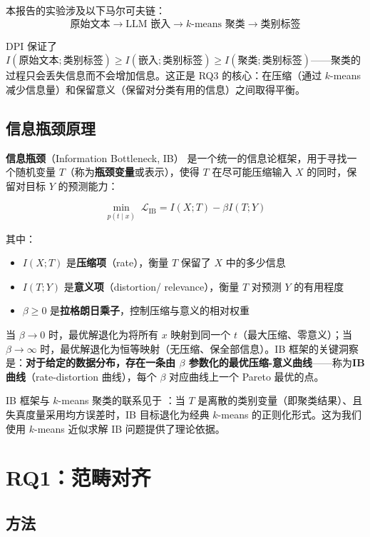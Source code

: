 \documentclass[11pt,a4paper]{article}
\begin{document}
本报告的实验涉及以下马尔可夫链：
\[
\text{原始文本} \to \text{LLM 嵌入} \to k\text{-means 聚类} \to \text{类别标签}
\]

DPI 保证了 $I(\text{原始文本}; \text{类别标签}) \geq I(\text{嵌入}; \text{类别标签}) \geq I(\text{聚类}; \text{类别标签})$——聚类的过程只会丢失信息而不会增加信息。这正是 RQ3 的核心：在压缩（通过 $k$-means 减少信息量）和保留意义（保留对分类有用的信息）之间取得平衡。

\subsection{信息瓶颈原理}

\textbf{信息瓶颈}（Information Bottleneck, IB）\cite{tishby2000} 是一个统一的信息论框架，用于寻找一个随机变量 $T$（称为\textbf{瓶颈变量}或表示），使得 $T$ 在尽可能压缩输入 $X$ 的同时，保留对目标 $Y$ 的预测能力：

\[
\min_{p(t \mid x)} \; \mathcal{L}_{\text{IB}} = I(X;T) - \beta I(T;Y)
\tag{9}
\]

其中：
\begin{itemize}[noitemsep]
  \item $I(X;T)$ 是\textbf{压缩项}（rate），衡量 $T$ 保留了 $X$ 中的多少信息
  \item $I(T;Y)$ 是\textbf{意义项}（distortion/ relevance），衡量 $T$ 对预测 $Y$ 的有用程度
  \item $\beta \geq 0$ 是\textbf{拉格朗日乘子}，控制压缩与意义的相对权重
\end{itemize}

当 $\beta \to 0$ 时，最优解退化为将所有 $x$ 映射到同一个 $t$（最大压缩、零意义）；当 $\beta \to \infty$ 时，最优解退化为恒等映射（无压缩、保全部信息）。IB 框架的关键洞察是：\textbf{对于给定的数据分布，存在一条由 $\beta$ 参数化的最优压缩-意义曲线}——称为\textbf{IB 曲线}（rate-distortion 曲线），每个 $\beta$ 对应曲线上一个 Pareto 最优的点。

IB 框架与 $k$-means 聚类的联系见于 \cite{slonim2000}：当 $T$ 是离散的类别变量（即聚类结果）、且失真度量采用均方误差时，IB 目标退化为经典 $k$-means 的正则化形式。这为我们使用 $k$-means 近似求解 IB 问题提供了理论依据。

\section{RQ1：范畴对齐}

\subsection{方法}
\end{document}
